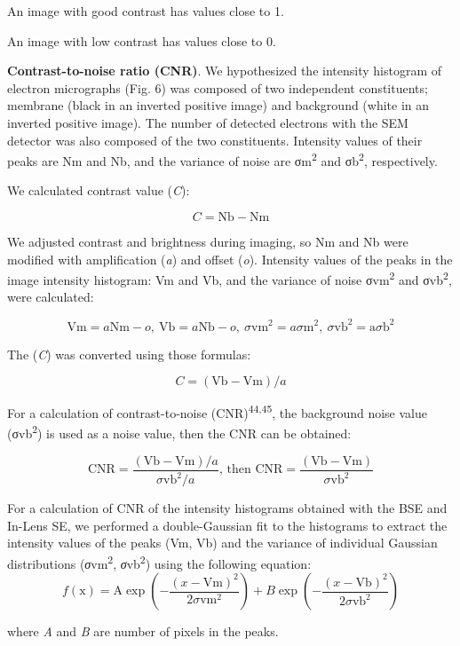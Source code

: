 \documentclass{article}
\begin{document}
An image with good contrast has values close to 1.

An image with low contrast has values close to 0.

\textbf{Contrast-to-noise ratio (CNR)}. We hypothesized the intensity histogram of electron micrographs (Fig. 6) was composed of two independent constituents; membrane (black in an inverted positive image) and background (white in an inverted positive image). The number of detected electrons with the SEM detector was also composed of the two constituents. Intensity values of their peaks are Nm and Nb, and the variance of noise are σm\textsuperscript{2} and σb\textsuperscript{2}, respectively.

We calculated contrast value (\emph{C}):

\[ C = \text{Nb} - \text{Nm} \]

We adjusted contrast and brightness during imaging, so Nm and Nb were modified with amplification (\emph{a}) and offset (\emph{o}). Intensity values of the peaks in the image intensity histogram: Vm and Vb, and the variance of noise σvm\textsuperscript{2} and σvb\textsuperscript{2}, were calculated:

\[ \text{Vm} = a\text{Nm} - o,\ \text{Vb} = a\text{Nb} - o,\ \sigma\text{vm}^2 = a\sigma\text{m}^2,\ \sigma\text{vb}^2 = \text{a}\sigma\text{b}^2 \]

The (\emph{C}) was converted using those formulas:

\[ C = (\text{Vb} - \text{Vm})/a \]

For a calculation of contrast-to-noise (CNR)\textsuperscript{44,45}, the background noise value (σvb\textsuperscript{2}) is used as a noise value, then the CNR can be obtained:

\[ \text{CNR} = \frac{(\text{Vb} - \text{Vm})/a}{\sigma\text{vb}^2/a}\text{, then CNR} = \frac{(\text{Vb} - \text{Vm})}{\sigma\text{vb}^2} \]

For a calculation of CNR of the intensity histograms obtained with the BSE and In-Lens SE, we performed a double-Gaussian fit to the histograms to extract the intensity values of the peaks (Vm, Vb) and the variance of individual Gaussian distributions (\emph{σ}vm\textsuperscript{2}, \emph{σ}vb\textsuperscript{2}) using the following equation:
\[ f(\text{x}) = \text{A} \exp\left(-\frac{(x - \text{Vm})^2}{2\sigma\text{vm}^2}\right) + B \exp\left(-\frac{(x - \text{Vb})^2}{2\sigma\text{vb}^2}\right) \]

\noindent where \emph{A} and \emph{B} are number of pixels in the peaks.
\end{document}
